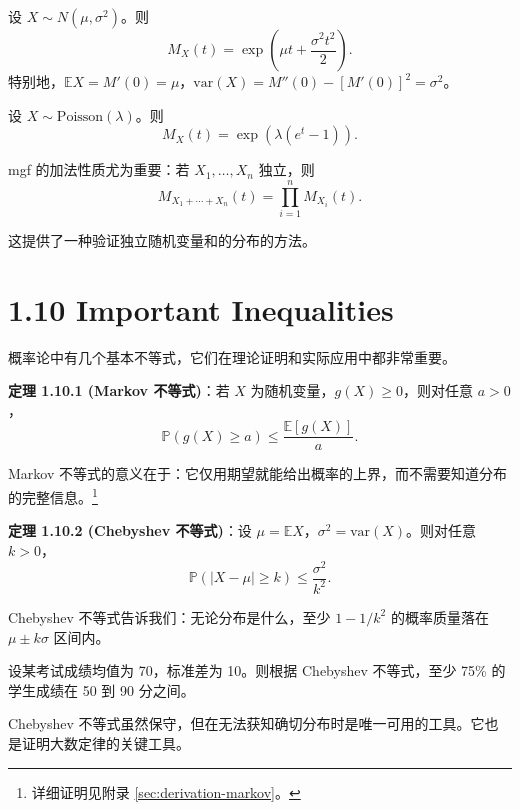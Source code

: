 \begin{example}\label{ex:normal-mgf-ch1}
设 $X \sim N(\mu, \sigma^2)$。则
\[
M_X(t) = \exp\left(\mu t + \frac{\sigma^2 t^2}{2}\right).
\]
特别地，$\mathbb{E}X = M'(0) = \mu$，$\text{var}(X) = M''(0) - [M'(0)]^2 = \sigma^2$。
\end{example}

\begin{example}\label{ex:poisson-mgf-ch1}
设 $X \sim \text{Poisson}(\lambda)$。则
\[
M_X(t) = \exp(\lambda(e^t - 1)).
\]
\end{example}

mgf 的加法性质尤为重要：若 $X_1, \ldots, X_n$ 独立，则
\[
M_{X_1+\cdots+X_n}(t) = \prod_{i=1}^n M_{X_i}(t).
\label{eq:mgf-sum-ch1}
\]

这提供了一种验证独立随机变量和的分布的方法。

\section{1.10 Important Inequalities}\label{sec:1.10}

概率论中有几个基本不等式，它们在理论证明和实际应用中都非常重要。

\begin{remark}
\textbf{定理 1.10.1 (Markov 不等式)}：若 $X$ 为随机变量，$g(X) \geq 0$，则对任意 $a > 0$，
\[
\mathbb{P}(g(X) \geq a) \leq \frac{\mathbb{E}[g(X)]}{a}.
\label{eq:markov-ch1}
\]

Markov 不等式的意义在于：它仅用期望就能给出概率的上界，而不需要知道分布的完整信息。\footnote{详细证明见附录 \cref{sec:derivation-markov}。}
\end{remark}

\begin{remark}
\textbf{定理 1.10.2 (Chebyshev 不等式)}：设 $\mu = \mathbb{E}X$，$\sigma^2 = \text{var}(X)$。则对任意 $k > 0$，
\[
\mathbb{P}(|X - \mu| \geq k) \leq \frac{\sigma^2}{k^2}.
\label{eq:chebyshev-ch1}
\]

Chebyshev 不等式告诉我们：无论分布是什么，至少 $1 - 1/k^2$ 的概率质量落在 $\mu \pm k\sigma$ 区间内。
\end{remark}

\begin{example}[Chebyshev应用]\label{ex:chebyshev-app-ch1}
设某考试成绩均值为 70，标准差为 10。则根据 Chebyshev 不等式，至少 75\% 的学生成绩在 50 到 90 分之间。
\end{example}

Chebyshev 不等式虽然保守，但在无法获知确切分布时是唯一可用的工具。它也是证明大数定律的关键工具。

